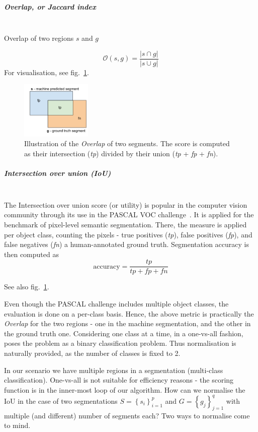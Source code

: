 \subparagraph*{Overlap, or Jaccard index}\mbox{}\\
Overlap of two regions %
$s$ and $g$

\[
\mathcal{O}\left(s,g\right)=\frac{\left|s\cap g\right|}{\left|s\cup g\right|}
\]
For visualisation, see fig.~\ref{fig:overlap-IoU}.

\begin{figure}[ht!]
\centering
\includegraphics[width=0.3\textwidth]{images/scoring_fcns/intersection-over-union_score_illustrated.png}
\caption{Illustration of the \textit{Overlap} of two segments. The score is computed as their intersection (\textit{tp}) divided by their union (\textit{tp} + \textit{fp} + \textit{fn}).}
\label{fig:overlap-IoU}
\end{figure}

\subparagraph*{Intersection over union (IoU)}\mbox{}\\
The Intersection over union score (or utility) %
is popular in the computer vision community through its use in the PASCAL VOC challenge~\cite{pascal-voc-2012}. It is applied for the benchmark of pixel-level semantic segmentation. There, the measure is applied per object class, counting the pixels - true positives (\textit{tp}), false positives (\textit{fp}), and false negatives (\textit{fn}) \wrt a human-annotated ground truth. Segmentation accuracy is then computed as
\[
 \text{accuracy} = \frac{\textit{tp}}{\textit{tp} + \textit{fp} + \textit{fn}}
\]

See also fig.~\ref{fig:overlap-IoU}.

Even though the PASCAL challenge includes multiple object classes, the evaluation is done on a per-class basis. Hence, the above metric is practically the \textit{Overlap} for the two regions - one in the machine segmentation, and the other in the ground truth one. 
Considering one class at a time, in a one-vs-all fashion, poses the problem as a binary classification problem. Thus normalisation is naturally provided, as the number of classes is fixed to 2.

In our scenario we have multiple regions in a segmentation (multi-class classification). One-vs-all is not suitable for efficiency reasons - the scoring function is in the inner-most loop of our algorithm. How can we normalise the IoU in the case of two segmentations $S=\left\{ {s_{i}}\right\} _{i=1}^{p}$
and $G=\left\{ {g_{j}}\right\} _{j=1}^{q}$ with multiple (and different) number of segments each? Two ways to normalise come to mind.

